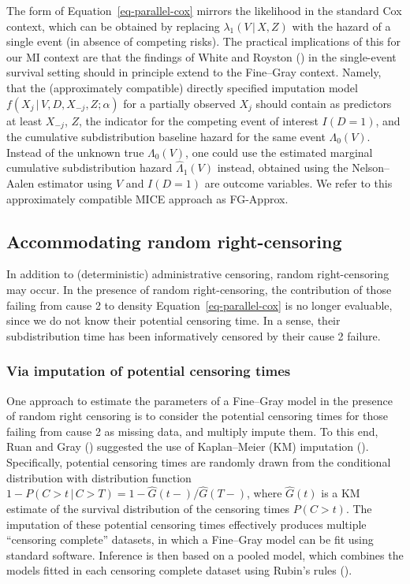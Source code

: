 \documentclass[
  letterpaper,
  paper=240mm:170mm,
  twoside=true,
  open=right,
  fontsize=10pt,
  pagesize=false,
  BCOR=15mm,
  DIV=14,
  headinclude=true,
  footinclude=false,
  headsepline=on]{scrbook}
\newcommand{\given}{\,|\,}
\begin{document}
The form of Equation~\ref{eq-parallel-cox} mirrors the likelihood in the
standard Cox context, which can be obtained by replacing
\(\lambda_1(V \given X, Z)\) with the hazard of a single event (in
absence of competing risks). The practical implications of this for our
MI context are that the findings of White and Royston
() in the
single-event survival setting should in principle extend to the
Fine--Gray context. Namely, that the (approximately compatible) directly
specified imputation model \(f(X_j \given V, D, X_{-j}, Z;\alpha)\) for
a partially observed \(X_j\) should contain as predictors at least
\(X_{-j}\), \(Z\), the indicator for the competing event of interest
\(I(D = 1)\), and the cumulative subdistribution baseline hazard for the
same event \(\Lambda_0(V)\). Instead of the unknown true
\(\Lambda_0(V)\), one could use the estimated marginal cumulative
subdistribution hazard \(\hat{\Lambda}_1(V)\) instead, obtained using
the Nelson--Aalen estimator using \(V\) and \(I(D = 1)\) are outcome
variables. We refer to this approximately compatible MICE approach as
FG-Approx.

\subsection{Accommodating random
right-censoring}\label{accommodating-random-right-censoring}

In addition to (deterministic) administrative censoring, random
right-censoring may occur. In the presence of random right-censoring,
the contribution of those failing from cause 2 to density
Equation~\ref{eq-parallel-cox} is no longer evaluable, since we do not
know their potential censoring time. In a sense, their subdistribution
time has been informatively censored by their cause 2 failure.

\subsubsection{Via imputation of potential censoring
times}\label{sec-imp-cens}

One approach to estimate the parameters of a Fine--Gray model in the
presence of random right censoring is to consider the potential
censoring times for those failing from cause 2 as missing data, and
multiply impute them. To this end, Ruan and Gray
() suggested the
use of Kaplan--Meier (KM) imputation
().
Specifically, potential censoring times are randomly drawn from the
conditional distribution with distribution function
\(1 - P(C > t \given C > T) = 1 - \hat{G}(t-)/\hat{G}(T-)\), where
\(\hat{G}(t)\) is a KM estimate of the survival distribution of the
censoring times \(P(C > t)\). The imputation of these potential
censoring times effectively produces multiple ``censoring complete''
datasets, in which a Fine--Gray model can be fit using standard
software. Inference is then based on a pooled model, which combines the
models fitted in each censoring complete dataset using Rubin's rules
().
\end{document}
